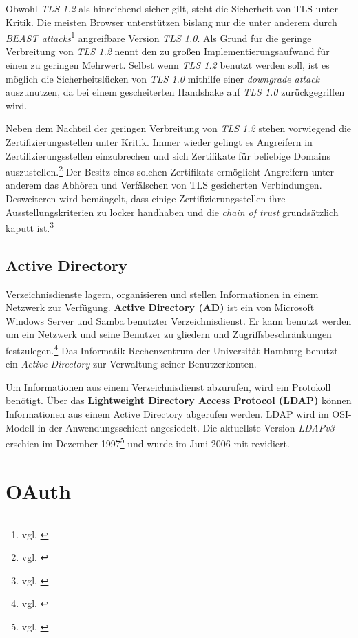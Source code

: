 \documentclass[12pt,a4paper,pointednumbers,abstracton]{scrartcl}
\begin{document}
Obwohl \emph{TLS 1.2} als hinreichend sicher gilt, steht die Sicherheit von TLS unter Kritik.
Die meisten Browser unterstützen bislang nur die unter anderem durch \emph{BEAST attacks}\footnote{vgl. \cite{DR11}} angreifbare Version \emph{TLS 1.0}.
Als Grund für die geringe Verbreitung von \emph{TLS 1.2} nennt \cite{Rit12} den zu großen Implementierungsaufwand für einen zu geringen Mehrwert.
Selbst wenn \emph{TLS 1.2} benutzt werden soll, ist es möglich die Sicherheitslücken von \emph{TLS 1.0} mithilfe einer \emph{downgrade attack} auszunutzen, da bei einem gescheiterten Handshake auf \emph{TLS 1.0} zurückgegriffen wird.

Neben dem Nachteil der geringen Verbreitung von \emph{TLS 1.2} stehen vorwiegend die Zertifizierungsstellen unter Kritik.
Immer wieder gelingt es Angreifern in Zertifizierungsstellen einzubrechen und sich Zertifikate für beliebige Domains auszustellen.\footnote{vgl. \cite[Section 3]{AE12}}
Der Besitz eines solchen Zertifikats ermöglicht Angreifern unter anderem das Abhören und Verfälschen von TLS gesicherten Verbindungen.
Desweiteren wird bemängelt, dass einige Zertifizierungsstellen ihre Ausstellungskriterien zu locker handhaben und die \emph{chain of trust} grundsätzlich kaputt ist.\footnote{vgl. \cite{SS12}}

\subsection{Active Directory}

Verzeichnisdienste lagern, organisieren und stellen Informationen in einem Netzwerk zur Verfügung.
\textbf{Active Directory (AD)} ist ein von Microsoft Windows Server und Samba benutzter Verzeichnisdienst.
Er kann benutzt werden um ein Netzwerk und seine Benutzer zu gliedern und Zugriffsbeschränkungen festzulegen.\footnote{vgl. \cite[Chapter 1]{Po09}}
Das Informatik Rechenzentrum der Universität Hamburg benutzt ein \emph{Active Directory} zur Verwaltung seiner Benutzerkonten.

Um Informationen aus einem Verzeichnisdienst abzurufen, wird ein Protokoll benötigt.
Über das \textbf{Lightweight Directory Access Protocol (LDAP)} können Informationen aus einem Active Directory abgerufen werden.
LDAP wird im OSI-Modell in der Anwendungsschicht angesiedelt.
Die aktuellste Version \emph{LDAPv3} erschien im Dezember 1997\footnote{vgl. \cite{RFC2251}} und wurde im Juni 2006 mit \cite{RFC5246} revidiert.

\newpage
\section{OAuth}
\label{sec:oauth}
\end{document}
